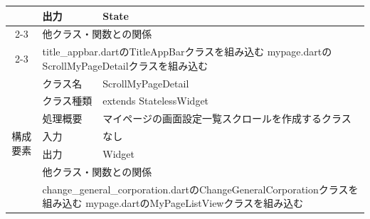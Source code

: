 \begin{longtable}{|c|l|l|}
                        & 出力                                                                                           & State                                                \\ \cline{2-3}
                        & \multicolumn{2}{l|}{他クラス・関数との関係}                                                                                                                    \\ \cline{2-3}
                        & \multicolumn{2}{p{14cm}|}{title\_appbar.dartのTitleAppBarクラスを組み込む
  \newline mypage.dartのScrollMyPageDetailクラスを組み込む}                                                                                                                            \\ \hline
  \multirow{7}{*}{構成要素} & クラス名                                                                                         & ScrollMyPageDetail                                   \\ \cline{2-3}
                        & クラス種類                                                                                        & extends StatelessWidget                              \\ \cline{2-3}
                        & 処理概要                                                                                         & \multicolumn{1}{p{12cm}|}{マイページの画面設定一覧スクロールを作成するクラス} \\ \cline{2-3}
                        & 入力                                                                                           & なし                                                   \\ \cline{2-3}
                        & 出力                                                                                           & Widget                                               \\ \cline{2-3}
                        & \multicolumn{2}{l|}{他クラス・関数との関係}                                                                                                                    \\ \cline{2-3}
                        & \multicolumn{2}{p{14cm}|}{change\_general\_corporation.dartのChangeGeneralCorporationクラスを組み込む
  \newline mypage.dartのMyPageListViewクラスを組み込む}                                                                                                                                \\ \hline

\end{longtable}

